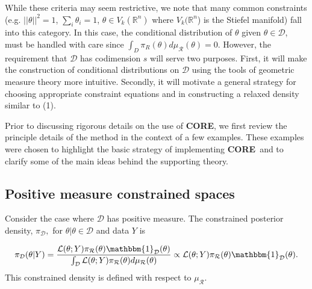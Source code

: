 \documentclass[10pt,fleqn]{article}
\newcommand{\leo}[1]{{\color{blue}{Leo: #1}}}
\newcommand{\core}{\textbf{CORE}}
\DeclareMathOperator{\1}{\mathbbm{1}}
\begin{document}
While these criteria may seem restrictive, we note that many common constraints (e.g. $||\theta||^2 = 1$, $\sum_i \theta_i = 1$, $\theta \in V_k(\mathbb{R}^n)$ where $V_k(\mathbb{R}^n$) is the Stiefel manifold) fall into this category.  In this case, the conditional distribution of $\theta$ given $\theta \in \mathcal{D}$, must be handled with care since $\int_D \pi_R(\theta) d\mu_\mathcal{R} (\theta) =0$.  However, the requirement that $\mathcal{D}$ has codimension $s$ will serve two purposes.  First, it will make the construction of conditional distributions on $\mathcal{D}$ using the tools of geometric measure theory more intuitive.  Secondly, it will motivate a general strategy for choosing appropriate constraint equations and in constructing a relaxed density similar to (1). 

Prior to discussing rigorous details on the use of \core, we first review the  principle details of the method in the context of a few examples.  These examples were chosen to highlight the basic strategy of implementing \core\, and to clarify some of the main ideas behind the supporting theory.


%

\subsection{Positive measure constrained spaces}
\label{SEC:Positive_measure_methods}
Consider the case where $\mathcal{D}$ has positive measure.  The constrained posterior density, $\pi_\mathcal{D},$ for $\theta|\theta \in \mathcal{D}$ and data $Y$ is 

$$\pi_\mathcal{D}(\theta|Y) = \frac{\mathcal{L}(\theta; Y) \pi_\mathcal{R}(\theta)\mathbbm{1}_\mathcal{D}(\theta)}{\int_\mathcal{D} \mathcal{L}(\theta; Y) \pi_\mathcal{R}(\theta)d\mu_\mathcal{R}(\theta)}\propto \mathcal{L}(\theta; Y) \pi_\mathcal{R}(\theta)\mathbbm{1}_\mathcal{D}(\theta). $$
This constrained density is defined with respect to $\mu_\mathcal{R}$.  
\end{document}
